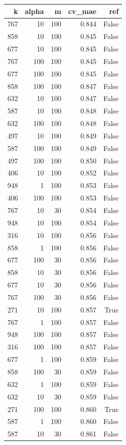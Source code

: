 \begin{tabular}{rrrrr}
\toprule
k & alpha & m & cv_mae & ref \\
\midrule
767 & 10 & 100 & 0.844 & False \\
858 & 10 & 100 & 0.845 & False \\
677 & 10 & 100 & 0.845 & False \\
767 & 100 & 100 & 0.845 & False \\
677 & 100 & 100 & 0.845 & False \\
858 & 100 & 100 & 0.847 & False \\
632 & 10 & 100 & 0.847 & False \\
587 & 10 & 100 & 0.848 & False \\
632 & 100 & 100 & 0.848 & False \\
497 & 10 & 100 & 0.849 & False \\
587 & 100 & 100 & 0.849 & False \\
497 & 100 & 100 & 0.850 & False \\
406 & 10 & 100 & 0.852 & False \\
948 & 1 & 100 & 0.853 & False \\
406 & 100 & 100 & 0.853 & False \\
767 & 10 & 30 & 0.854 & False \\
948 & 10 & 100 & 0.854 & False \\
316 & 10 & 100 & 0.856 & False \\
858 & 1 & 100 & 0.856 & False \\
677 & 100 & 30 & 0.856 & False \\
858 & 10 & 30 & 0.856 & False \\
677 & 10 & 30 & 0.856 & False \\
767 & 100 & 30 & 0.856 & False \\
271 & 10 & 100 & 0.857 & True \\
767 & 1 & 100 & 0.857 & False \\
948 & 100 & 100 & 0.857 & False \\
316 & 100 & 100 & 0.857 & False \\
677 & 1 & 100 & 0.859 & False \\
858 & 100 & 30 & 0.859 & False \\
632 & 1 & 100 & 0.859 & False \\
632 & 10 & 30 & 0.859 & False \\
271 & 100 & 100 & 0.860 & True \\
587 & 1 & 100 & 0.860 & False \\
587 & 10 & 30 & 0.861 & False \\

\end{tabular}
